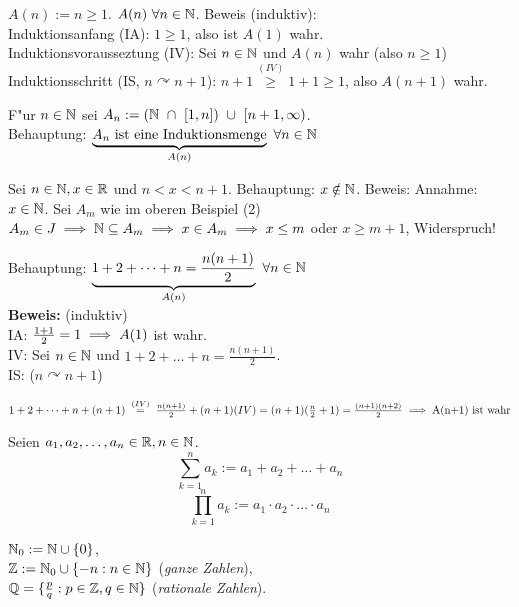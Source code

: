 \documentclass[a4paper,twoside,DIV15,BCOR12mm]{scrbook}
\begin{document}
\begin{beispiele}
\item $A(n) := n \ge 1$. $A(n)\ \forall n \in \mathbb{N}$. Beweis (induktiv):\\
Induktionsanfang (IA): $1 \ge 1$, also ist $A(1)$ wahr. \\
Induktionsvorausseztung (IV): Sei $n \in \mathbb{N}$ und $A(n)$ wahr (also $n \ge 1$) \\
Induktionsschritt (IS, $n \curvearrowright n + 1$): $n+1 
\stackrel{(IV)}{\ge} 1 + 1 \ge 1$, also $A(n+1)$ wahr.
\item F"ur $n \in \mathbb{N}$ sei $A_n:=(\mathbb{N}\ \cap\ [1,n])\ \cup\ [n+1, \infty)$. \\
Behauptung: $\underbrace{A_n \text{ ist eine Induktionsmenge}}_{A(n)} \ \forall n \in \mathbb{N}$
\item Sei $n \in \mathbb{N}, x \in \mathbb{R}$ und $n<x<n+1$. Behauptung: $x \notin \mathbb{N}$. Beweis: Annahme: $x \in \mathbb{N}$. Sei $A_m$ wie im oberen Beispiel (2) \folgt $A_m \in J \implies \mathbb{N} \subseteq A_m \implies x \in A_m \implies x \le m$ oder $x\ge m+1$, Widerspruch!
\item 
Behauptung: $\underbrace{1+2+\dots +n = \frac{n(n+1)}{2}}_{A(n)}\ \forall n\in \mathbb{N}$\\
\textbf{Beweis:} (induktiv)\\
IA: $\frac{1+1}{2}=1 \implies A(1)$ ist wahr.\\
IV: Sei $n\in \mathbb{N}$ und $1+2+\dots +n = \frac{n(n+1)}{2}$.\\
IS: ($n \curvearrowright  n+1$)

$1+2+\dots +n+(n+1)
 \gleichwegen{(IV)} \frac{n(n+1)}{2} + (n+1) (IV)
 = (n+1)(\frac{n}{2}+1)
 = \frac{(n+1)(n+2)}{2}
\folgt \text{A(n+1) ist wahr}$
\end{beispiele}

\begin{definition}
\begin{liste}
\item Seien $a_1,a_2,\ldots,a_n \in \mathbb{R}, n \in \mathbb{N}$.
$$ \sum_{k=1}^n a_k  := a_1 +     a_2 +     \ldots +     a_n $$
$$ \prod_{k=1}^n a_k := a_1 \cdot a_2 \cdot \ldots \cdot a_n $$

\item $\mathbb{N}_0 := \mathbb{N} \cup \{0\}$,\\
 $\mathbb{Z} := \mathbb{N}_0 \cup \{-n: n\in \mathbb{N}\}$ (\textit{ganze Zahlen}),\\
 $\mathbb{Q} = \{ \frac{p}{q}: p \in \mathbb{Z}, q \in \mathbb{N} \}$ (\textit{rationale Zahlen}).
\end{liste}
\end{definition}
\end{document}
